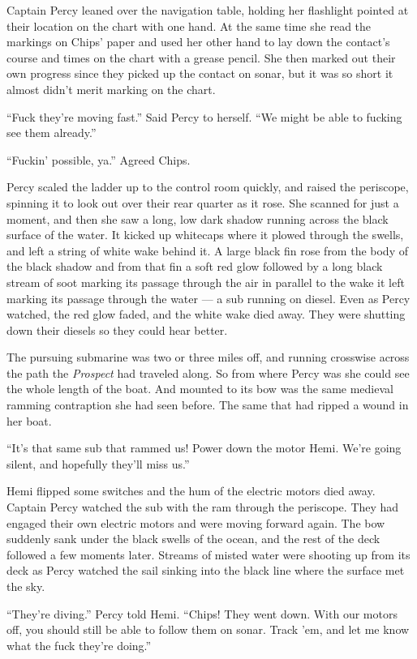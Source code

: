 \documentclass[]{scrbook}
\begin{document}
Captain Percy leaned over the navigation table, holding her flashlight
pointed at their location on the chart with one hand. At the same time
she read the markings on Chips' paper and used her other hand to lay
down the contact's course and times on the chart with a grease pencil.
She then marked out their own progress since they picked up the contact
on sonar, but it was so short it almost didn't merit marking on the
chart.

``Fuck they're moving fast.'' Said Percy to herself. ``We might be able
to fucking see them already.''

``Fuckin' possible, ya.'' Agreed Chips.

Percy scaled the ladder up to the control room quickly, and raised the
periscope, spinning it to look out over their rear quarter as it rose.
She scanned for just a moment, and then she saw a long, low dark shadow
running across the black surface of the water. It kicked up whitecaps
where it plowed through the swells, and left a string of white wake
behind it. A large black fin rose from the body of the black shadow and
from that fin a soft red glow followed by a long black stream of soot
marking its passage through the air in parallel to the wake it left
marking its passage through the water --- a sub running on diesel. Even
as Percy watched, the red glow faded, and the white wake died away. They
were shutting down their diesels so they could hear better.

The pursuing submarine was two or three miles off, and running crosswise
across the path the \emph{Prospect} had traveled along. So from where
Percy was she could see the whole length of the boat. And mounted to its
bow was the same medieval ramming contraption she had seen before. The
same that had ripped a wound in her boat.

``It's that same sub that rammed us! Power down the motor Hemi. We're
going silent, and hopefully they'll miss us.''

Hemi flipped some switches and the hum of the electric motors died away.
Captain Percy watched the sub with the ram through the periscope. They
had engaged their own electric motors and were moving forward again. The
bow suddenly sank under the black swells of the ocean, and the rest of
the deck followed a few moments later. Streams of misted water were
shooting up from its deck as Percy watched the sail sinking into the
black line where the surface met the sky.

``They're diving.'' Percy told Hemi. ``Chips! They went down. With our
motors off, you should still be able to follow them on sonar. Track 'em,
and let me know what the fuck they're doing.''
\end{document}
